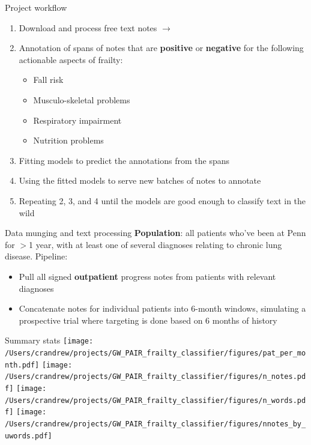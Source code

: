 \documentclass[10pt]{beamer}
\begin{document}
\begin{frame}{Project workflow}
\begin{enumerate}
\item Download and process free text notes $\rightarrow$
\item Annotation of spans of notes that are {\color{red}\textbf{positive}} or {\color{green}\textbf{negative}} for the following actionable aspects of frailty:
	\begin{itemize}
	\item Fall risk
	\item Musculo-skeletal problems
	\item Respiratory impairment
	\item Nutrition problems
	\end{itemize}
\item Fitting models to predict the annotations from the spans
\item Using the fitted models to serve new batches of notes to annotate
\item Repeating 2, 3, and 4 until the models are good enough to classify text in the wild
\end{enumerate}
\end{frame}

\begin{frame}{Data munging and text processing}
\textbf{Population}:  all patients who've been at Penn for $>$1 year, with at least one of several diagnoses relating to chronic lung disease.
Pipeline:
\begin{itemize}
\item Pull all signed \textbf{outpatient} progress notes from patients with relevant diagnoses
\item Concatenate notes for individual patients into 6-month windows, simulating a prospective trial where targeting is done based on 6 months of history
\end{itemize}
\end{frame}

\begin{frame}{Summary stats}
\texttt{[image: /Users/crandrew/projects/GW\_PAIR\_frailty\_classifier/figures/pat\_per\_month.pdf]}
\texttt{[image: /Users/crandrew/projects/GW\_PAIR\_frailty\_classifier/figures/n\_notes.pdf]}
\texttt{[image: /Users/crandrew/projects/GW\_PAIR\_frailty\_classifier/figures/n\_words.pdf]}
\texttt{[image: /Users/crandrew/projects/GW\_PAIR\_frailty\_classifier/figures/nnotes\_by\_uwords.pdf]}
\end{frame}
\end{document}
